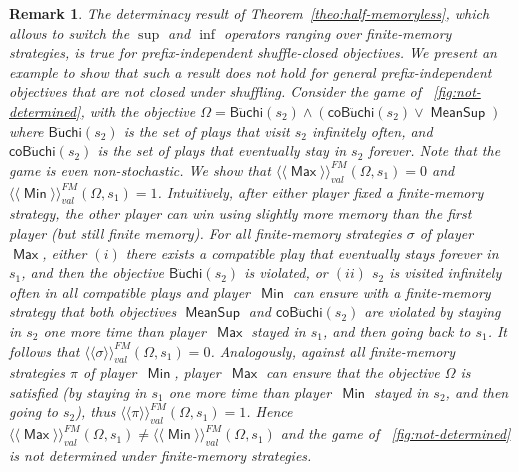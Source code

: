 \documentclass{article}
\newtheorem{remark}{Remark}
\newcommand{\winval}[1]{\langle \! \langle #1 \rangle\! \rangle_{\mathit{val}} }
\newcommand{\vaf}{\winval{\ma}^{{FM}}}
\newcommand{\vbf}{\winval{\mi}^{{FM}}}
\newcommand{\straavaf}{\winval{\straa}^{{FM}}}
\newcommand{\strabvbf}{\winval{\strab}^{{FM}}}
\newcommand{\straa}{\sigma}
\newcommand{\strab}{\pi}
\DeclareMathOperator{\ma}{\mathsf{Max}}
\DeclareMathOperator{\mi}{\mathsf{Min}}
\newcommand{\MeanSup}{\operatorname{\mathsf{MeanSup}}}
\newcommand{\Buchi}{\operatorname{\mathsf{B\ddot{u}chi}}}
\newcommand{\coBuchi}{\operatorname{\mathsf{coB\ddot{u}chi}}}
\begin{document}
\begin{remark}\label{rem:nodet}
The determinacy result of Theorem~\ref{theo:half-memoryless},
which allows to switch the $\sup$ and $\inf$ operators ranging over finite-memory
strategies, is true for prefix-independent shuffle-closed objectives.
We present an example to show that such a result does not hold  
for general prefix-independent objectives that are not closed under shuffling. 
Consider the game of \figurename~\ref{fig:not-determined}, 
with the objective  $\Omega = \Buchi(s_2) \land (\coBuchi(s_2) \lor \MeanSup)$
where $\Buchi(s_2)$ is the set of plays that visit $s_2$ infinitely often, 
and $\coBuchi(s_2)$ is the set of plays that eventually stay in $s_2$ forever. 
Note that the game is even non-stochastic.
We show that $\vaf(\Omega,s_1) = 0$ and $\vbf(\Omega,s_1) = 1$. Intuitively, 
after either player fixed a finite-memory strategy, the other player can win
using slightly more memory than the first player (but still finite memory).
For all finite-memory strategies $\straa$ of player~$\ma$, either $(i)$ there exists a compatible
play that eventually stays forever in $s_1$, and then the objective $\Buchi(s_2)$
is violated, or $(ii)$ $s_2$ is visited infinitely often in all compatible plays 
and player~$\mi$ can ensure with a finite-memory strategy that both objectives $\MeanSup$ and 
$\coBuchi(s_2)$ are violated by staying in $s_2$ one more time than player~$\ma$ 
stayed in $s_1$, and then going back to $s_1$. It follows that $\straavaf(\Omega,s_1) = 0$.
Analogously, against all finite-memory strategies $\strab$ of player~$\mi$,
player~$\ma$ can ensure that the objective $\Omega$ is satisfied (by staying
in $s_1$ one more time than player~$\mi$ stayed in $s_2$, and then going to $s_2$), thus 
$\strabvbf(\Omega,s_1) = 1$. Hence $\vaf(\Omega,s_1) \neq \vbf(\Omega,s_1)$ and the
game of \figurename~\ref{fig:not-determined} is not determined under finite-memory strategies.
\end{remark}
\end{document}
